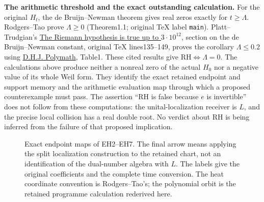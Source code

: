 \documentclass[11pt,a4paper]{article}
\theoremstyle{definition}\newtheorem{definition}[theorem]{Definition}
\begin{document}
\EH\textbf{The arithmetic threshold and the exact outstanding calculation.}
For the original $H_t$, the de Bruijn--Newman theorem gives real zeros
exactly for $t\ge\Lambda$. Rodgers--Tao prove $\Lambda\ge0$
(Theorem1.1; original TeX label \texttt{main}). Platt--Trudgian's
\href{https://arxiv.org/abs/2004.09765}{The Riemann hypothesis is true up
to $3\cdot10^{12}$}, section on the de Bruijn--Newman constant, original
TeX lines135--149, proves the corollary $\Lambda\le0.2$ using
\href{https://arxiv.org/abs/1904.12438}{D.H.J. Polymath}, Table1.
These cited results give $\mathrm{RH}\iff\Lambda=0$.
The calculations above produce neither a nonreal zero of the actual
$H_0$ nor a negative value of its whole Weil form. They identify the
exact retained endpoint and support memory and the arithmetic
evaluation map through which a proposed counterexample must pass.
The assertion ``RH is false because $e$ is invertible'' does not follow
from these computations: the unital-localization receiver is $L$, and the
precise local collision has a real double root. No verdict about RH is
being inferred from the failure of that proposed implication.

\begin{figure}[p]
\centering
{}
\caption{Exact endpoint maps of EH2--EH7. The final arrow means applying
the split localization construction to the retained chart, not an
identification of the dual-number algebra with $L$. The labels give the
original coefficients and the complete time conversion. The heat
coordinate convention is Rodgers--Tao's; the polynomial orbit is the
retained programme calculation rederived here.}
\end{figure}
\end{document}
